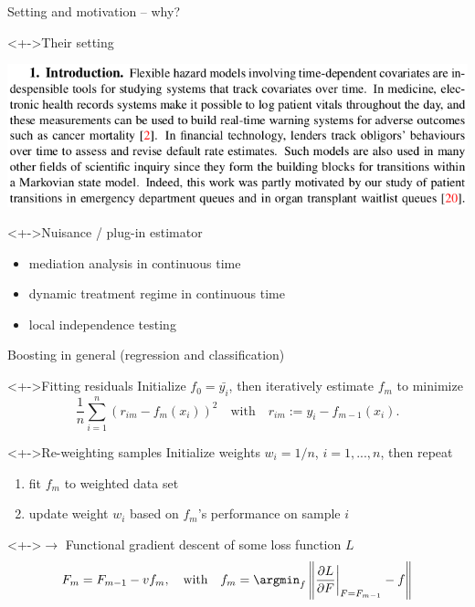 \documentclass{beamer}\usepackage{listings}
\begin{document}
\begin{frame}[label={sec:orgae00579}]{Setting and motivation -- why?}
\begin{block}<+->{Their setting}
\begin{center}
\includegraphics[width=.9\linewidth]{./screenshots/Screenshot_motivation.png}
\end{center}
\end{block}

\begin{block}<+->{Nuisance / plug-in estimator}
\begin{itemize}
\item mediation analysis in continuous time
\item dynamic treatment regime in continuous time
\item local independence testing
\end{itemize}
\end{block}
\end{frame}

\begin{frame}[label={sec:org9363528}]{Boosting in general (regression and classification)}
\pause
\begin{block}<+->{Fitting residuals}
Initialize $f_0 = \bar{y_i}$, then iteratively estimate $f_m$ to minimize
\begin{equation*}
  \frac{1}{n}\sum_{i=1}^{n}(r_{im} - f_m(x_i))^2 \quad \text{with} \quad r_{im} := y_i - f_{m-1}(x_i).
\end{equation*}
\end{block}

\begin{block}<+->{Re-weighting samples}
Initialize weights \(w_i = 1/n\), \(i = 1, ..., n\), then repeat
\begin{enumerate}
\item fit \(f_m\) to weighted data set
\item update weight \(w_i\) based on \(f_m\)'s performance on sample \(i\)
\end{enumerate}
\end{block}

\begin{block}<+->{\(\rightarrow\) Functional gradient descent of some loss function \(L\)}
\vspace{-0.5cm}
\begin{equation*}  
  F_m = F_{m-1} - v f_m, \quad \text{with} \quad  f_m = \argmin_f \left\| \frac{\partial L}{\partial F} \bigg\rvert_{F=F_{m-1}} -f \right\|
\end{equation*}
\end{block}
\end{frame}
\end{document}
